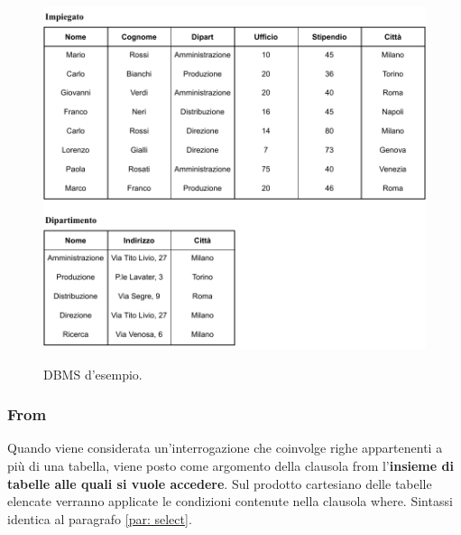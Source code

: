 \documentclass[a4paper]{article}
\begin{document}
	\begin{figure}[!htp]
		\centering
		\includegraphics[width=\textwidth]{img/select-ex_dbms.pdf}
		\label{img: select dbms}
		\caption{DBMS d'esempio.}
	\end{figure}\newpage

	\subsubsection{\textsf{From}}
	
	Quando viene considerata un'interrogazione che coinvolge righe appartenenti a più di una tabella, viene posto come argomento della clausola \textsf{from} l'\textbf{insieme di tabelle alle quali si vuole accedere}. Sul prodotto cartesiano delle tabelle elencate verranno applicate le condizioni contenute nella clausola \textsf{where}. Sintassi identica al paragrafo \ref{par: select}.\newline
	
\end{document}
